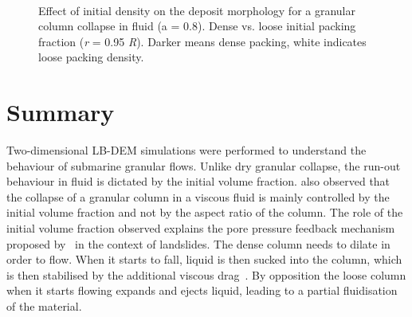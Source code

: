 \documentclass[12pt,a4paper,twocolumn,fleqn]{narms}
\begin{document}
\begin{figure}[htbp]
\centering
{}\\
\caption[Effect of initial density on the deposit morphology
for a granular column collapse in fluid (a = 0.8).]{Effect of initial density 
on the deposit morphology
for a granular column collapse in fluid (a = 0.8). Dense vs. loose initial 
packing fraction (\textit{r} = 0.95 \textit{R}). Darker means dense packing, 
white indicates loose packing density.}
\label{fig:Dense_Loose_PT}
\end{figure}

\section{Summary}

Two-dimensional LB-DEM simulations were performed to understand the behaviour of
submarine granular flows. Unlike dry granular collapse, the run-out behaviour in
fluid is dictated by the initial volume fraction.
 also observed that the collapse of a granular column in a 
viscous fluid is mainly controlled by the initial volume fraction and not by 
the aspect ratio of the column. The role of the initial volume fraction 
observed explains the pore pressure feedback mechanism proposed 
by~ in the context of landslides. The dense column needs to 
dilate in order to flow. When it starts to fall, liquid is then sucked into the 
column, which is then stabilised by the additional viscous 
drag~. By opposition the loose column when 
it starts flowing expands and ejects liquid, leading to a partial fluidisation 
of the material.



\end{document}
